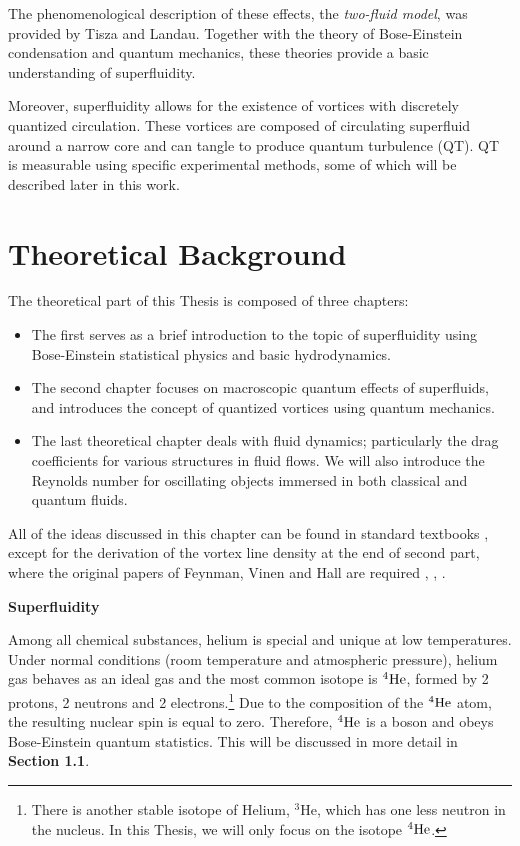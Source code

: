 The phenomenological description of these effects, the \textit{two-fluid model}, was provided by Tisza and Landau. Together with the theory of Bose-Einstein condensation and quantum mechanics, these theories provide a basic understanding of superfluidity.

Moreover, superfluidity allows for the existence of vortices with discretely quantized circulation. These vortices are composed of circulating superfluid around a narrow core and can tangle to produce quantum turbulence (QT). QT is measurable using specific experimental methods, some of which will be described later in this work.




\newpage
\chapter{Theoretical Background}

The theoretical part of this Thesis is composed of three chapters:

\begin{itemize}
	\item[1.] The first serves as a brief introduction to the topic of superfluidity using  Bose-Einstein statistical physics and basic hydrodynamics.
	
	\item[2.] The second chapter focuses on macroscopic quantum effects of superfluids, and introduces the concept of quantized vortices using quantum mechanics.
	
	\item[3.] The last theoretical chapter deals with fluid dynamics; particularly the drag coefficients for various structures in fluid flows. We will also introduce the Reynolds number for oscillating objects immersed in both classical and quantum fluids.
\end{itemize}
All of the ideas discussed in this chapter can be found in standard textbooks \cite{skrbek}, \cite{landau} except for the derivation of the vortex line density at the end of second part, where the original papers of Feynman, Vinen and Hall are required \cite{feynman}, \cite{vinen1}, \cite{vinen2}.

\vspace{1cm}
{\Huge \bfseries Superfluidity}
\vspace{0.3cm}


Among all chemical substances, helium is special and unique at low temperatures. Under normal conditions (room temperature and atmospheric pressure), helium gas behaves as an ideal gas and the most common isotope is ${}^4\mathrm{He}$, formed by 2 protons, 2 neutrons and 2 electrons.\footnote{There is another stable isotope of Helium, ${}^3\mathrm{He}$, which has one less neutron in the nucleus. In this Thesis, we will only focus on the isotope ${}^4\mathrm{He}$.} Due to the composition of the ${}^4\mathrm{He}$ atom, the resulting nuclear spin is equal to zero. Therefore, ${}^4\mathrm{He}$  is a boson and obeys Bose-Einstein quantum statistics. This will be discussed in more detail in {\sffamily\textbf{Section 1.1}}.

